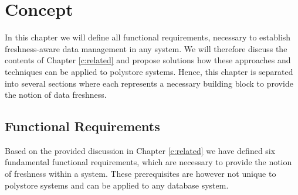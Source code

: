 \chapter{Concept}
\label{c:concept}


In this chapter we will define all functional requirements, necessary to establish freshness-aware data management in any system.
We will therefore discuss the contents of Chapter \ref{c:related} and propose solutions how these approaches and techniques can be applied to polystore systems.
Hence, this chapter is separated into several sections where each represents a necessary building block to provide the notion of data freshness.


\section{Functional Requirements}

Based on the provided discussion in Chapter \ref{c:related} we have defined six fundamental functional
requirements, which are necessary to provide the notion of freshness within a system.
These prerequisites are however not unique to polystore systems and can be applied to any database system. 

